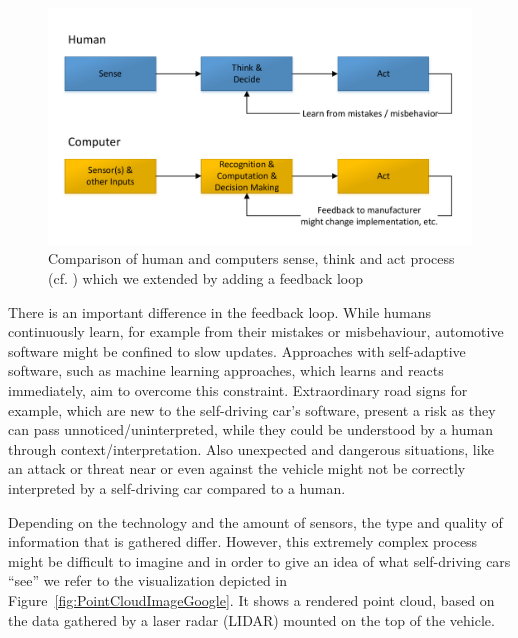 \begin{figure}
\centering
\includegraphics[width=1\linewidth]{Figures/Figures_V20171008_SenseDecideAct.pdf}
\caption{Comparison of human and computers sense, think and act process (cf. \cite{Ghisio2016}) which we extended by adding a feedback loop}
\label{fig:ComparisonHumanComputerProcess}
\end{figure}


There is an important difference in the feedback loop. While humans continuously learn, for example from their mistakes or misbehaviour, automotive software might be confined to slow updates. Approaches with self-adaptive software, such as machine learning approaches, which learns and reacts immediately, aim to overcome this constraint. Extraordinary road signs for example, which are new to the self-driving car's software, present a risk as they can pass unnoticed/uninterpreted, while they could be understood by a human through context/interpretation. Also unexpected and dangerous situations, like an attack or threat near or even against the vehicle might not be correctly interpreted by a self-driving car compared to a human. 



Depending on the technology and the amount of sensors, the type and quality of information that is gathered differ. However, this extremely complex process might be difficult to imagine and in order to give an idea of what self-driving cars \enquote{see} we refer to the visualization depicted in Figure~\ref{fig:PointCloudImageGoogle}. It shows a rendered point cloud, based on the data gathered by a laser radar (LIDAR) mounted on the top of the vehicle. 

